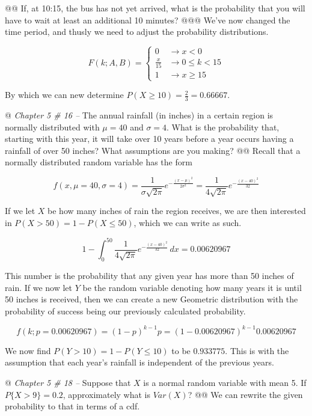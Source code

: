 \documentclass[10pt]{article}
\begin{document}
\begin{easylist}[enumerate]
    @@ If, at 10:15, the bus has not yet arrived, what is the probability that you will have to wait at least an
    additional 10 minutes?
    @@@ We've now changed the time period, and thusly we need to adjust the probability distributions.

    \[
        F(k; A, B) =
        \begin{cases}
            0 &\to x < 0\\
            \frac{x}{15} &\to 0 \le k < 15\\
            1 &\to x \ge 15
        \end{cases}
    \]

    By which we can new determine $P(X \ge 10) = \frac{2}{3} = \boxed{0.66667}$.

    @ \textit{Chapter 5 \# 16 --} The annual rainfall (in inches) in a certain region is normally distributed with $\mu
    = 40$ and $\sigma = 4$. What is the probability that, starting with this year, it will take over 10 years before a
    year occurs having a rainfall of over 50 inches? What assumptions are you making?
    @@ Recall that a normally distributed random variable has the form

    \[
        f(x, \mu=40, \sigma=4) = \frac{1}{\sigma\sqrt{2\pi}} e^{-\frac{(x-\mu)^2}{2\sigma^2} } =
        \frac{1}{4\sqrt{2\pi}} e^{-\frac{(x-40)^2}{32}}
    \]

    If we let $X$ be how many inches of rain the region receives, we are then interested in $P(X > 50) = 1 - P(X \le
    50)$, which we can write as such.

    \[ 1 - \int^{50}_0 \frac{1}{4\sqrt{2\pi}} e^{-\frac{(x-40)^2}{32}} \, dx = 0.00620967 \]

    This number is the probability that any given year has more than 50 inches of rain. If we now let $Y$ be the random
    variable denoting how many years it is until 50 inches is received, then we can create a new Geometric distribution
    with the probability of success being our previously calculated probability.

    \[ f(k; p=0.00620967) = {(1 - p)}^{k-1} p = {(1 - 0.00620967)}^{k-1} 0.00620967 \]

    We now find $P(Y > 10) = 1 - P(Y \le 10)$ to be $\boxed{0.933775}$. This is with the assumption that each year's
    rainfall is independent of the previous years.

    @ \textit{Chapter 5 \# 18 --} Suppose that $X$ is a normal random variable with mean 5. If $P\{X > 9\} = 0.2$,
    approximately what is $Var(X)$?
    @@ We can rewrite the given probability to that in terms of a cdf.


\end{easylist}
\end{document}
